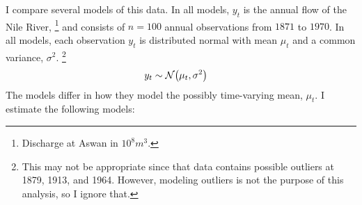 \documentclass[12pt]{article}
\begin{document}
I compare several models of this data.
In all models, $y_{t}$ is the annual flow of the Nile River,%
\footnote{Discharge at Aswan in $10^8 m^{3}$.} %
and consists of $n = 100$ annual observations from $1871$ to $1970$.
In all models, each observation $y_{t}$ is distributed normal with mean $\mu_{t}$ and a common variance, $\sigma^{2}$.%
\footnote{
  This may not be appropriate since that data contains possible outliers at 1879, 1913, and 1964.
  However, modeling outliers is not the purpose of this analysis, so I ignore that.
}
\begin{equation}
  \label{dlm:eq:10}
  \begin{aligned}[t]
    y_{t} &\sim \mathcal{N}\mathopen{}\left(\mu_{t}, \sigma^{2}\right)\mathclose{}
  \end{aligned}
\end{equation}
The models differ in how they model the possibly time-varying mean, $\mu_{t}$.
I estimate the following models:
\end{document}
